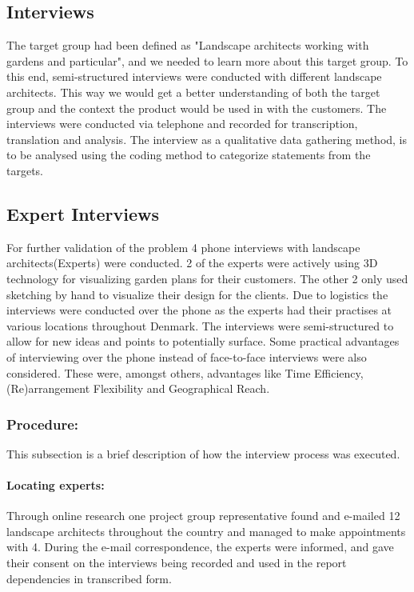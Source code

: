 	\subsection{Interviews}
	
	The target group had been defined as "Landscape architects working with gardens and particular", and we needed to learn more about this target group. To this end, semi-structured interviews were conducted with different landscape architects. This way we would get a better understanding of both the target group and the context the product would be used in with the customers. The interviews were conducted via telephone and recorded for transcription, translation and analysis. The interview as a qualitative data gathering method, is to be analysed using the coding method to categorize statements from the targets.
	
	
	\subsection{Expert Interviews}\label{sec:expertInterviews}
		For further validation of the problem 4 phone interviews with landscape architects(Experts) were conducted. 2 of the experts were actively using 3D technology for visualizing garden plans for their customers. The other 2 only used sketching by hand to visualize their design for the clients. Due to logistics the interviews were conducted over the phone as the experts had their practises at various locations throughout Denmark. The interviews were semi-structured to allow for new ideas and points to potentially surface. Some practical advantages of interviewing over the phone instead of face-to-face interviews were also considered. These were, amongst others, advantages like Time Efficiency, (Re)arrangement Flexibility and Geographical Reach\cite{telephoneInterview}. 
		
		\subsubsection{Procedure:}
		This subsection is a brief description of how the interview process was executed.
		
		\paragraph*{Locating experts:}Through online research one project group representative found and e-mailed 12 landscape architects throughout the country and managed to make appointments with 4. During the e-mail correspondence, the experts were informed, and gave their consent on the interviews being recorded and used in the report dependencies in transcribed form.
		
